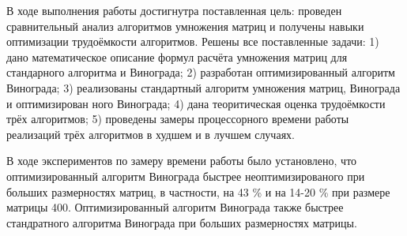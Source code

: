 \Conclusion
       В ходе выполнения работы достигнутра поставленная цель: проведен сравнительный анализ алгоритмов умножения матриц и получены навыки оптимизации трудоёмкости алгоритмов. Решены все поставленные задачи:
1) дано математическое описание формул расчёта умножения матриц для стандарного
алгоритма и Винограда;
2) разработан оптимизированный алгоритм Винограда;
3) реализованы стандартный алгоритм умножения матриц, Винограда и оптимизирован­
ного Винограда;
4) дана теоритическая оценка трудоёмкости трёх алгоритмов;
5) проведены замеры процессорного времени работы реализаций трёх алгоритмов в худшем
и в лучшем случаях.

	В ходе экспериментов по замеру времени работы было установлено, что 
        оптимизированный алгоритм Винограда быстрее неоптимизированого при больших размерностях матриц, в частности, на 43 \% и
        на 14-20 \% при размере матрицы 400. Оптимизированный алгоритм Винограда также быстрее стандратного алгоритма Винограда при больших размерностях матрицы.
